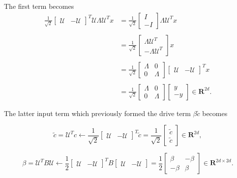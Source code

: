 \begin{enumerate}
The first term becomes
\begin{align*}
\frac{1}{\sqrt{2}} \begin{bmatrix}
\mathcal{U} & -\mathcal{U}
\end{bmatrix}^T \mathcal{U} \Lambda \mathcal{U}^T x
&=
\frac{1}{\sqrt{2}} \begin{bmatrix}
I \\ -I
\end{bmatrix}
\Lambda \mathcal{U}^T x
\\
\\
&=
\frac{1}{\sqrt{2}} \begin{bmatrix}
\Lambda \mathcal{U}^T
\\
-\Lambda \mathcal{U}^T 
\end{bmatrix} x
\\
\\
&=
\frac{1}{\sqrt{2}}
\begin{bmatrix}
\Lambda & 0
\\
0 & \Lambda
\end{bmatrix}
\begin{bmatrix}
\mathcal{U} & -\mathcal{U}
\end{bmatrix}^T x
\\
\\
&=
\frac{1}{\sqrt{2}}
\begin{bmatrix}
\Lambda & 0 
\\
0 & \Lambda
\end{bmatrix}
\begin{bmatrix} y \\ -y \end{bmatrix} \in \mathbf{R}^{2d}.
\end{align*}

The latter input term which previously formed the drive term $\beta \tilde{c}$ becomes

$$
\tilde{c} = \mathcal{U}^T c \leftarrow \frac{1}{\sqrt{2}}\begin{bmatrix}
\mathcal{U} & -\mathcal{U} 
\end{bmatrix}^T \tilde{c} = 
\frac{1}{\sqrt{2}}\begin{bmatrix}
\tilde{c} \\ \tilde{c}
\end{bmatrix} \in \mathbf{R}^{2d},
$$

$$
\beta = \mathcal{U}^T B \mathcal{U} \leftarrow
\frac{1}{2}\begin{bmatrix}
\mathcal{U} & -\mathcal{U} 
\end{bmatrix}^T
B
\begin{bmatrix}
\mathcal{U} & -\mathcal{U} 
\end{bmatrix}
=
\frac{1}{2}\begin{bmatrix}
\beta & -\beta
\\
-\beta & \beta
\end{bmatrix} \in \mathbf{R}^{2d \times 2d}.
$$


\end{enumerate}
